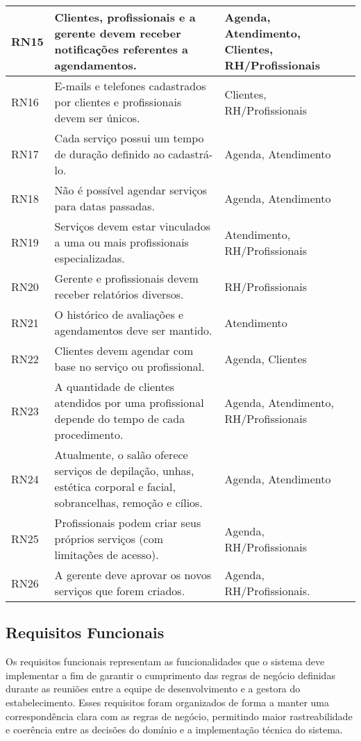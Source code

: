 \begin{longtable}{|p{1.2cm}|p{10cm}|p{4cm}|}
	\hline
	RN15 & Clientes, profissionais e a gerente devem receber notificações referentes a agendamentos. & Agenda, Atendimento, Clientes, RH/Profissionais \\
	\hline
	RN16 & E-mails e telefones cadastrados por clientes e profissionais devem ser únicos. & Clientes, RH/Profissionais \\
	\hline
	RN17 & Cada serviço possui um tempo de duração definido ao cadastrá-lo. & Agenda, Atendimento \\
	\hline
	RN18 & Não é possível agendar serviços para datas passadas. & Agenda, Atendimento \\
	\hline
	RN19 & Serviços devem estar vinculados a uma ou mais profissionais especializadas. & Atendimento, RH/Profissionais \\
	\hline
	RN20 & Gerente e profissionais devem receber relatórios diversos. & RH/Profissionais \\
	\hline
	RN21 & O histórico de avaliações e agendamentos deve ser mantido. & Atendimento \\
	\hline
	RN22 & Clientes devem agendar com base no serviço ou profissional. & Agenda, Clientes \\
	\hline
	RN23 & A quantidade de clientes atendidos por uma profissional depende do tempo de cada procedimento. & Agenda, Atendimento, RH/Profissionais \\
	\hline
	RN24 & Atualmente, o salão oferece serviços de depilação, unhas, estética corporal e facial, sobrancelhas, remoção e cílios. & Agenda, Atendimento \\
	\hline
	RN25 & Profissionais podem criar seus próprios serviços (com limitações de acesso). & Agenda, RH/Profissionais \\
	\hline
	RN26 & A gerente deve aprovar os novos serviços que forem criados. & Agenda, RH/Profissionais. \\
	\hline
	
\end{longtable}

\subsection{Requisitos Funcionais}

Os requisitos funcionais representam as funcionalidades que o sistema deve implementar a fim de garantir o cumprimento das regras de negócio definidas durante as reuniões entre a equipe de desenvolvimento e a gestora do estabelecimento. Esses requisitos foram organizados de forma a manter uma correspondência clara com as regras de negócio, permitindo maior rastreabilidade e coerência entre as decisões do domínio e a implementação técnica do sistema.

